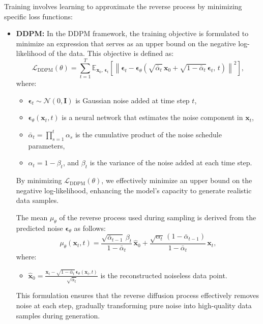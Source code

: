 Training involves learning to approximate the reverse process by minimizing specific loss functions:

\begin{itemize}
    \item \textbf{DDPM:} In the DDPM framework, the training objective is formulated to minimize an expression that serves as an upper bound on the negative log-likelihood of the data. This objective is defined as:
    \[
    \mathcal{L}_{\text{DDPM}}(\theta) = \sum_{t=1}^T \mathbb{E}_{\mathbf{x}_0,\, \mathbf{\epsilon}_t} \left[ \left\| \mathbf{\epsilon}_t - \mathbf{\epsilon}_\theta\left(\sqrt{\bar{\alpha}_t}\, \mathbf{x}_0 + \sqrt{1 - \bar{\alpha}_t}\, \mathbf{\epsilon}_t,\, t\right) \right\|^2 \right],
    \]
    where:
    \begin{itemize}
        \item \( \mathbf{\epsilon}_t \sim \mathcal{N}(0, \mathbf{I}) \) is Gaussian noise added at time step \( t \),
        \item \( \mathbf{\epsilon}_\theta(\mathbf{x}_t, t) \) is a neural network that estimates the noise component in \( \mathbf{x}_t \),
        \item \( \bar{\alpha}_t = \prod_{s=1}^t \alpha_s \) is the cumulative product of the noise schedule parameters,
        \item \( \alpha_t = 1 - \beta_t \), and \( \beta_t \) is the variance of the noise added at each time step.
    \end{itemize}

    By minimizing \( \mathcal{L}_{\text{DDPM}}(\theta) \), we effectively minimize an upper bound on the negative log-likelihood, enhancing the model's capacity to generate realistic data samples.

    The mean \( \mu_\theta \) of the reverse process used during sampling is derived from the predicted noise \( \mathbf{\epsilon}_\theta \) as follows:
    \[
    \mu_\theta(\mathbf{x}_t, t) = \frac{\sqrt{\bar{\alpha}_{t-1}}\, \beta_t}{1 - \bar{\alpha}_t}\, \hat{\mathbf{x}}_0 + \frac{\sqrt{\alpha_t}\, (1 - \bar{\alpha}_{t-1})}{1 - \bar{\alpha}_t}\, \mathbf{x}_t,
    \]
    where:
    \begin{itemize}
        \item \( \hat{\mathbf{x}}_0 = \frac{\mathbf{x}_t - \sqrt{1 - \bar{\alpha}_t}\, \mathbf{\epsilon}_\theta(\mathbf{x}_t, t)}{\sqrt{\bar{\alpha}_t}} \) is the reconstructed noiseless data point.
    \end{itemize}

    This formulation ensures that the reverse diffusion process effectively removes noise at each step, gradually transforming pure noise into high-quality data samples during generation.



\end{itemize}

